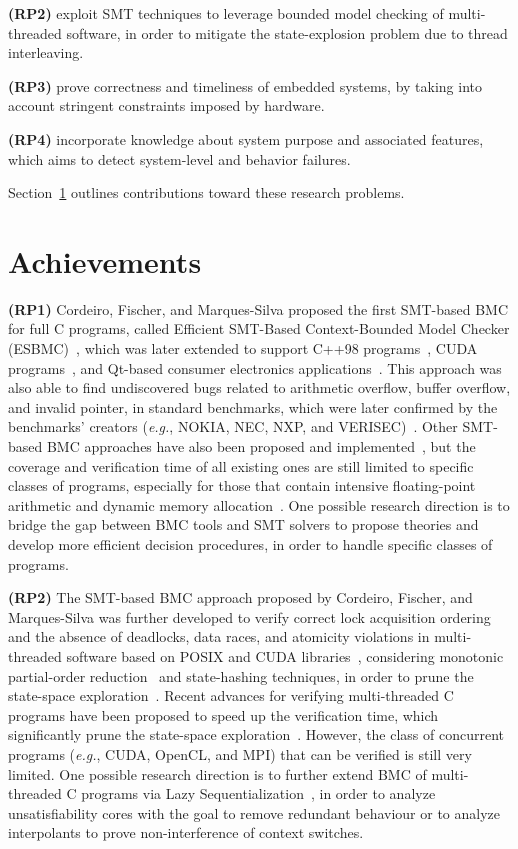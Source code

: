 \documentclass{acm_sen_article}
\begin{document}
\textbf{(RP2)} exploit SMT techniques to leverage bounded model checking of multi-threaded software, in order to mitigate the state-explosion problem due to thread interleaving.
	
\textbf{(RP3)} prove correctness and timeliness of embedded systems, by taking into account stringent constraints imposed by hardware.
	
\textbf{(RP4)} incorporate knowledge about system purpose and associated features, which aims to detect system-level and behavior failures.

Section~\ref{achievements} outlines contributions toward these research problems.

\section{Achievements}
\label{achievements}

\textbf{(RP1)} Cordeiro, Fischer, and Marques-Silva proposed the first SMT-based BMC for full C programs, called Efficient SMT-Based Context-Bounded Model Checker (ESBMC)~\cite{Cordeiro12}, which was later extended to support C++98 programs~\cite{ECBS13}, CUDA programs~\cite{Pereira15}, and Qt-based consumer electronics applications~\cite{Sousa15}. This approach was also able to find undiscovered bugs related to arithmetic overflow, buffer overflow, and invalid pointer, in standard benchmarks, which were later confirmed by the benchmarks' creators ({\it e.g.}, NOKIA, NEC, NXP, and VERISEC)~\cite{CordeiroF11,Cordeiro12}. Other SMT-based BMC approaches have also been proposed and implemented~\cite{MerzFS12}, but the coverage and verification time of all existing ones are still limited to specific classes of programs, especially for those that contain intensive floating-point arithmetic and dynamic memory allocation~\cite{Beyer14,BeyerSVCOMP15}. One possible research direction is to bridge the gap between BMC tools and SMT solvers to propose theories and develop more efficient decision procedures, in order to handle specific classes of programs.

\textbf{(RP2)} The SMT-based BMC approach proposed by Cordeiro, Fischer, and Marques-Silva was further developed to verify correct lock acquisition ordering and the absence of deadlocks, data races, and atomicity violations in multi-threaded software based on POSIX and CUDA libraries~\cite{CordeiroF11,Pereira15}, considering monotonic partial-order reduction~\cite{KahlonWG09} and state-hashing techniques, in order to prune the state-space exploration~\cite{morse15}. Recent advances for verifying multi-threaded C programs have been proposed to speed up the verification time, which significantly prune the state-space exploration~\cite{Inverso14,civl15}. However, the class of concurrent programs ({\it e.g.}, CUDA, OpenCL, and MPI) that can be verified is still very limited. One possible research direction is to further extend BMC of multi-threaded C programs via Lazy Sequentialization~\cite{Inverso14}, in order to analyze unsatisfiability cores with the goal to remove redundant behaviour or to analyze interpolants to prove non-interference of context switches.
\end{document}
